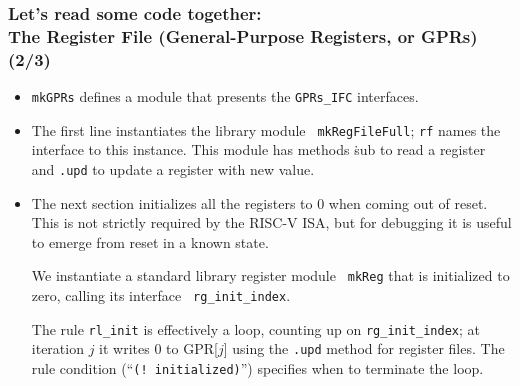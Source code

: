 
\begin{frame}[fragile]
\frametitle{Let's read some code together: \\
            The Register File (General-Purpose Registers, or GPRs) (2/3)}

\begin{center}\scriptsize


 \vspace{1ex}

 \begin{minipage}{0.8\textwidth}
  \begin{itemize}

   \item {\tt mkGPRs} defines a module that presents the {\tt GPRs\_IFC} interfaces.

   \item The first line instantiates the {\BSV} library module {\tt
     mkRegFileFull}; {\tt rf} names the interface to this instance.
     This module has methods {\.sub} to read a register and {\tt .upd}
     to update a register with new value.

   \item The next section initializes all the registers to 0 when
     coming out of reset.  This is not strictly required by the RISC-V
     ISA, but for debugging it is useful to emerge from reset in a
     known state.

     \vspace*{1ex}

     We instantiate a standard {\BSV} library register module {\tt
     mkReg} that is initialized to zero, calling its interface {\tt
     rg\_init\_index}.

     \vspace*{1ex}

     The rule {\tt rl\_init} is effectively a loop, counting up on
     {\tt rg\_init\_index}; at iteration $j$ it writes 0 to GPR[$j$]
     using the {\tt .upd} method for register files.  The rule
     condition (``{\tt (! initialized)}'') specifies when to terminate
     the loop.


\end{itemize}
\end{minipage}
\end{center}
\end{frame}
